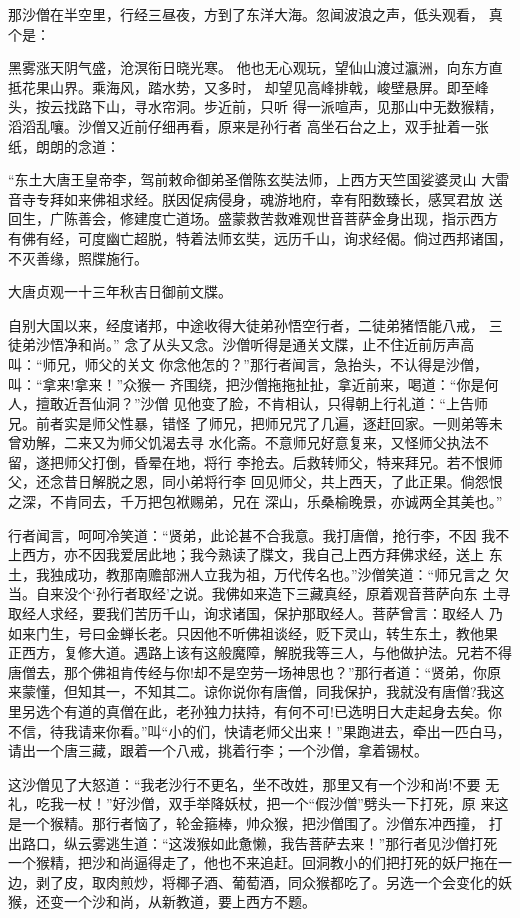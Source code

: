 那沙僧在半空里，行经三昼夜，方到了东洋大海。忽闻波浪之声，低头观看，
真个是：

黑雾涨天阴气盛，沧溟衔日晓光寒。
他也无心观玩，望仙山渡过瀛洲，向东方直抵花果山界。乘海风，踏水势，又多时，
却望见高峰排戟，峻壁悬屏。即至峰头，按云找路下山，寻水帘洞。步近前，只听
得一派喧声，见那山中无数猴精，滔滔乱嚷。沙僧又近前仔细再看，原来是孙行者
高坐石台之上，双手扯着一张纸，朗朗的念道：

“东土大唐王皇帝李，驾前敕命御弟圣僧陈玄奘法师，上西方天竺国娑婆灵山
大雷音寺专拜如来佛祖求经。朕因促病侵身，魂游地府，幸有阳数臻长，感冥君放
送回生，广陈善会，修建度亡道场。盛蒙救苦救难观世音菩萨金身出现，指示西方
有佛有经，可度幽亡超脱，特着法师玄奘，远历千山，询求经偈。倘过西邦诸国，
不灭善缘，照牒施行。

大唐贞观一十三年秋吉日御前文牒。

自别大国以来，经度诸邦，中途收得大徒弟孙悟空行者，二徒弟猪悟能八戒，
三徒弟沙悟净和尚。”
念了从头又念。沙僧听得是通关文牒，止不住近前厉声高叫：“师兄，师父的关文
你念他怎的？”那行者闻言，急抬头，不认得是沙僧，叫：“拿来!拿来！”众猴一
齐围绕，把沙僧拖拖扯扯，拿近前来，喝道：“你是何人，擅敢近吾仙洞？”沙僧
见他变了脸，不肯相认，只得朝上行礼道：“上告师兄。前者实是师父性暴，错怪
了师兄，把师兄咒了几遍，逐赶回家。一则弟等未曾劝解，二来又为师父饥渴去寻
水化斋。不意师兄好意复来，又怪师父执法不留，遂把师父打倒，昏晕在地，将行
李抢去。后救转师父，特来拜兄。若不恨师父，还念昔日解脱之恩，同小弟将行李
回见师父，共上西天，了此正果。倘怨恨之深，不肯同去，千万把包袱赐弟，兄在
深山，乐桑榆晚景，亦诚两全其美也。”

行者闻言，呵呵冷笑道：“贤弟，此论甚不合我意。我打唐僧，抢行李，不因
我不上西方，亦不因我爱居此地；我今熟读了牒文，我自己上西方拜佛求经，送上
东土，我独成功，教那南赡部洲人立我为祖，万代传名也。”沙僧笑道：“师兄言之
欠当。自来没个‘孙行者取经’之说。我佛如来造下三藏真经，原着观音菩萨向东
土寻取经人求经，要我们苦历千山，询求诸国，保护那取经人。菩萨曾言：取经人
乃如来门生，号曰金蝉长老。只因他不听佛祖谈经，贬下灵山，转生东土，教他果
正西方，复修大道。遇路上该有这般魔障，解脱我等三人，与他做护法。兄若不得
唐僧去，那个佛祖肯传经与你!却不是空劳一场神思也？”那行者道：“贤弟，你原
来蒙懂，但知其一，不知其二。谅你说你有唐僧，同我保护，我就没有唐僧?我这
里另选个有道的真僧在此，老孙独力扶持，有何不可!已选明日大走起身去矣。你
不信，待我请来你看。”叫“小的们，快请老师父出来！”果跑进去，牵出一匹白马，
请出一个唐三藏，跟着一个八戒，挑着行李；一个沙僧，拿着锡杖。

这沙僧见了大怒道：“我老沙行不更名，坐不改姓，那里又有一个沙和尚!不要
无礼，吃我一杖！”好沙僧，双手举降妖杖，把一个“假沙僧”劈头一下打死，原
来这是一个猴精。那行者恼了，轮金箍棒，帅众猴，把沙僧围了。沙僧东冲西撞，
打出路口，纵云雾逃生道：“这泼猴如此惫懒，我告菩萨去来！”那行者见沙僧打死
一个猴精，把沙和尚逼得走了，他也不来追赶。回洞教小的们把打死的妖尸拖在一
边，剥了皮，取肉煎炒，将椰子酒、葡萄酒，同众猴都吃了。另选一个会变化的妖
猴，还变一个沙和尚，从新教道，要上西方不题。

